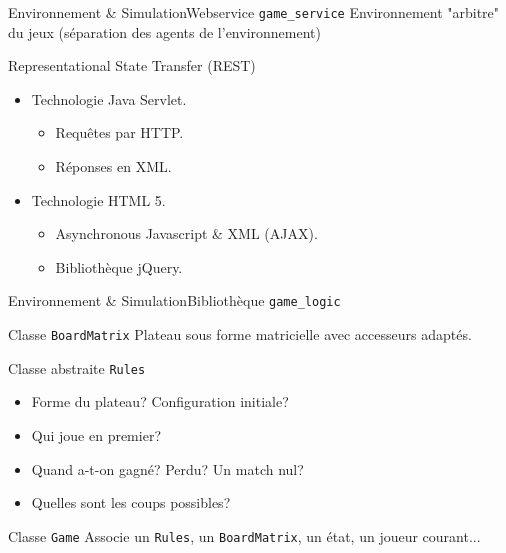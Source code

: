 
\begin{frame}{Environnement \& Simulation}{Webservice \texttt{game\_service}}
Environnement "arbitre" du jeux (séparation des agents de l'environnement)

\begin{block}{Representational State Transfer (REST)}
\begin{itemize}
\item Technologie Java Servlet.
	\begin{itemize}
	\item Requêtes par HTTP.
	\item Réponses en XML.
	\end{itemize}
\item Technologie HTML 5.
	\begin{itemize}
	\item Asynchronous Javascript \& XML (AJAX).
	\item Bibliothèque jQuery.
	\end{itemize}
\end{itemize}
\end{block}


\end{frame}



\begin{frame}{Environnement \& Simulation}{Bibliothèque \texttt{game\_logic}}

\begin{block}{Classe \texttt{BoardMatrix}}
Plateau sous forme matricielle avec accesseurs adaptés.
\end{block}

\pause

\begin{block}{Classe abstraite \texttt{Rules}}
\begin{itemize}
\item Forme du plateau? Configuration initiale?
\item Qui joue en premier?
\item Quand a-t-on gagné? Perdu? Un match nul?
\item Quelles sont les coups possibles?
\end{itemize}
\end{block}

\pause

\begin{block}{Classe \texttt{Game}}
Associe un \texttt{Rules}, un \texttt{BoardMatrix}, un état, un joueur courant...
\end{block}

\end{frame}


